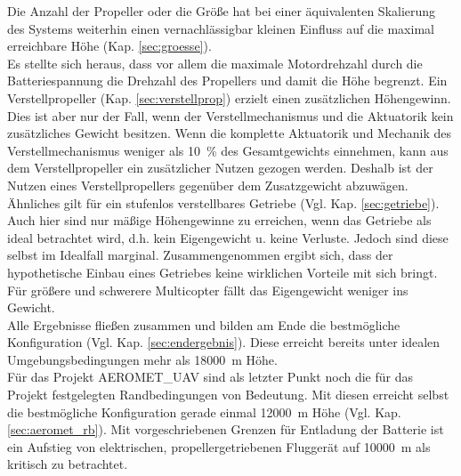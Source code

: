 Die Anzahl der Propeller oder die Größe hat bei einer äquivalenten Skalierung des Systems weiterhin einen vernachlässigbar kleinen Einfluss auf die maximal erreichbare Höhe (Kap. \ref{sec:groesse}). \\
Es stellte sich heraus, dass vor allem die maximale Motordrehzahl durch die Batteriespannung die Drehzahl des Propellers und damit die Höhe begrenzt. Ein Verstellpropeller (Kap. \ref{sec:verstellprop}) erzielt einen zusätzlichen Höhengewinn. Dies ist aber nur der Fall, wenn der Verstellmechanismus und die Aktuatorik kein zusätzliches Gewicht besitzen. Wenn die komplette Aktuatorik und Mechanik des Verstellmechanismus weniger als \SI{10}{\%} des Gesamtgewichts einnehmen, kann aus dem Verstellpropeller ein zusätzlicher Nutzen gezogen werden. Deshalb ist der Nutzen eines Verstellpropellers gegenüber dem Zusatzgewicht abzuwägen.
Ähnliches gilt für ein stufenlos verstellbares Getriebe (Vgl. Kap. \ref{sec:getriebe}). Auch hier sind nur mäßige Höhengewinne zu erreichen, wenn das Getriebe als ideal betrachtet wird, d.h. kein Eigengewicht u. keine Verluste. Jedoch sind diese selbst im Idealfall marginal. Zusammengenommen ergibt sich, dass der hypothetische Einbau eines Getriebes keine wirklichen Vorteile mit sich bringt. Für größere und schwerere Multicopter fällt das Eigengewicht weniger ins Gewicht. \\
Alle Ergebnisse fließen zusammen und bilden am Ende die bestmögliche Konfiguration (Vgl. Kap. \ref{sec:endergebnis}). Diese erreicht bereits unter idealen Umgebungsbedingungen mehr als \SI{18000}{m} Höhe. \\
Für das Projekt AEROMET\_UAV sind als letzter Punkt noch die für das Projekt festgelegten Randbedingungen von Bedeutung. Mit diesen erreicht selbst die bestmögliche Konfiguration gerade einmal \SI{12000}{m} Höhe (Vgl. Kap. \ref{sec:aeromet_rb}). Mit vorgeschriebenen Grenzen für Entladung der Batterie ist ein Aufstieg von elektrischen, propellergetriebenen Fluggerät auf \SI{10000}{m} als kritisch zu betrachtet.


